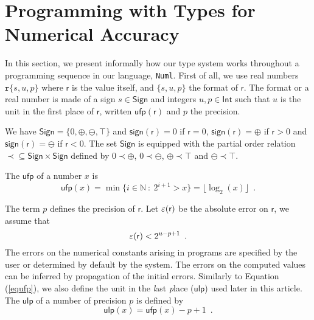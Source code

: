 
\section{Programming with Types for Numerical Accuracy}
\label{over}

In this section, we present informally how our type system works
throughout a programming sequence in our language, \texttt{Numl}.
First of all, we use real 
numbers  $\mathtt{r}\{s,u,p\}$ where $\mathsf{r}$
is the value itself, and $\{s,u,p\}$ the format of $\mathsf{r}$.
The format or a real number is made of a sign $s\in \mathsf{Sign}$ and integers 
$u,p\in \mathsf{Int}$ such that $u$ is the unit in the first place of $\mathsf{r}$,
written $\mathsf{ufp}(\mathsf{r})$ and $p$
the precision.

We have $\mathsf{Sign}=\{0,\oplus,\ominus,\top\}$ and $\mathsf{sign(r)}=0$ if $\mathsf{r}=0$,
$\mathsf{sign(r)}=\oplus$ if $\mathsf{r}>0$ and $\mathsf{sign(r)}=\ominus$ if $\mathsf{r}<0$.
The set $\mathsf{Sign}$ is equipped with the partial order relation $\prec\subseteq \mathsf{Sign}
\times \mathsf{Sign}$ defined by $0\prec \oplus$, $0\prec \ominus$, $\oplus\prec \top$ and 
$\ominus\prec \top$. 

The $\mathsf{ufp}$ of a number $x$ is 
\begin{equation}\label{equfp}
\mathsf{ufp}(x) = \min \big\{ i\in \mathbb{N}\ :\ 2^{i+1} > x\big\} = \lfloor \log_2(x)\rfloor\enspace.
\end{equation}

The term $p$ defines the precision of $\mathsf{r}$. Let $\varepsilon(\mathsf{r})$
be the absolute error on $\mathsf{r}$, we assume that
\begin{equation}
\varepsilon(\mathsf{r})< 2^{u-p+1}\enspace .
\end{equation}
The errors on the numerical constants arising in programs are specified by the user or determined by default by 
the system. The errors on the computed values can be inferred by  propagation of the
initial errors.
Similarly to Equation (\ref{equfp}), we also define the
 \textit{u}nit in the \textit{l}ast \textit{p}lace ($\mathsf{ulp}$) used later in this article.
The $\mathsf{ulp}$ of a number of precision $p$ is defined by
\begin{equation}
 \mathsf{ulp}(x) = \mathsf{ufp}(x) - p+1\enspace .
\end{equation}

